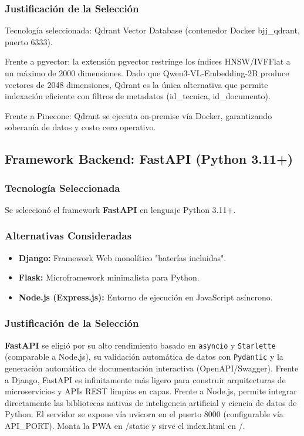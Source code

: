 \subsubsection{Justificación de la Selección}
Tecnología seleccionada: Qdrant Vector Database (contenedor Docker bjj\_qdrant, puerto 6333).

Frente a pgvector: la extensión pgvector restringe los índices HNSW/IVFFlat a un máximo de 2000 dimensiones. Dado que Qwen3-VL-Embedding-2B produce vectores de 2048 dimensiones, Qdrant es la única alternativa que permite indexación eficiente con filtros de metadatos (id\_tecnica, id\_documento).

Frente a Pinecone: Qdrant se ejecuta on-premise vía Docker, garantizando soberanía de datos y costo cero operativo.

\subsection{Framework Backend: FastAPI (Python 3.11+)}

\subsubsection{Tecnología Seleccionada}
Se seleccionó el framework \textbf{FastAPI} en lenguaje Python 3.11+.

\subsubsection{Alternativas Consideradas}
\begin{itemize}
    \item \textbf{Django:} Framework Web monolítico "baterías incluidas".
    \item \textbf{Flask:} Microframework minimalista para Python.
    \item \textbf{Node.js (Express.js):} Entorno de ejecución en JavaScript asíncrono.
\end{itemize}

\subsubsection{Justificación de la Selección}
\textbf{FastAPI} se eligió por su alto rendimiento basado en \texttt{asyncio} y \texttt{Starlette} (comparable a Node.js), su validación automática de datos con \texttt{Pydantic} y la generación automática de documentación interactiva (OpenAPI/Swagger). Frente a Django, FastAPI es infinitamente más ligero para construir arquitecturas de microservicios y APIs REST limpias en capas. Frente a Node.js, permite integrar directamente las bibliotecas nativas de inteligencia artificial y ciencia de datos de Python. El servidor se expone vía uvicorn en el puerto 8000 (configurable vía API\_PORT). Monta la PWA en /static y sirve el index.html en /.


